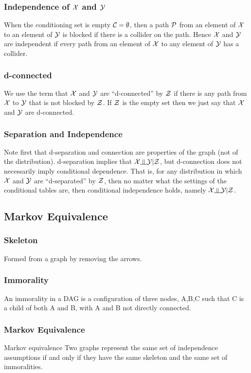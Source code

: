 \subsubsection*{Independence of $\mathcal{X}$ and $\mathcal{Y}$}
When the conditioning set is empty $\mathcal{C}=\emptyset$, then a path $\mathcal{P}$ from an element of $\mathcal{X}$ to an element of $\mathcal{Y}$ is blocked if there is a collider on the path. Hence $\mathcal{X}$ and $\mathcal{Y}$ are independent if every path from an element of $\mathcal{X}$ to any element of $\mathcal{Y}$ has a collider.

\subsubsection*{d-connected}
We use the term that $\mathcal{X}$ and $\mathcal{Y}$ are ``d-connected'' by $\mathcal{Z}$ if there is any path from $\mathcal{X}$ to $\mathcal{Y}$ that is not blocked by $\mathcal{Z}$. If $\mathcal{Z}$ is the empty set then we just say that $\mathcal{X}$ and $\mathcal{Y}$ are d-connected.

\subsubsection*{Separation and Independence}
Note first that d-separation and connection are properties of the graph (not of the distribution). d-separation implies that $\cX\indep \cY|\cZ$, but d-connection does not necessarily imply conditional dependence. That is, for any distribution in which $\mathcal{X}$ and $\mathcal{Y}$ are ``d-separated'' by $\mathcal{Z}$, then no matter what the settings of the conditional tables are, then conditional independence holds, namely $\cX\indep \cY|\cZ$.

\subsection{Markov Equivalence}

\subsubsection*{Skeleton}
Formed from a graph by removing the arrows.

\subsubsection*{Immorality}
An immorality in a DAG is a configuration of three nodes, A,B,C such that C is a child of both A and B, with A and B not directly connected.

\subsubsection*{Markov Equivalence}
Markov equivalence
Two graphs represent the same set of independence assumptions if and only if they have the same skeleton and the same set of immoralities.

